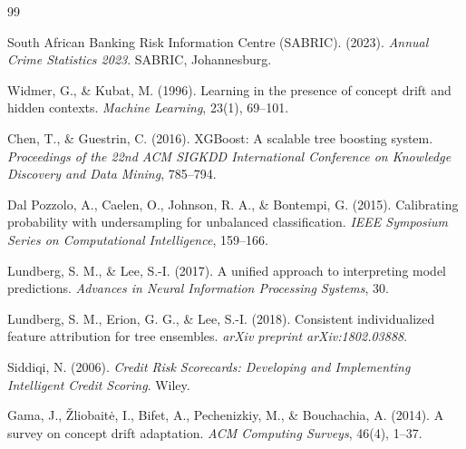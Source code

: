 \documentclass[12pt, a4paper]{article}
\begin{document}
\newpage
\begin{thebibliography}{99}

South African Banking Risk Information Centre (SABRIC). (2023).
\textit{Annual Crime Statistics 2023}.
SABRIC, Johannesburg.

Widmer, G., \& Kubat, M. (1996).
Learning in the presence of concept drift and hidden contexts.
\textit{Machine Learning}, 23(1), 69--101.

Chen, T., \& Guestrin, C. (2016).
XGBoost: A scalable tree boosting system.
\textit{Proceedings of the 22nd ACM SIGKDD International Conference on Knowledge Discovery and Data Mining}, 785--794.

Dal Pozzolo, A., Caelen, O., Johnson, R. A., \& Bontempi, G. (2015).
Calibrating probability with undersampling for unbalanced classification.
\textit{IEEE Symposium Series on Computational Intelligence}, 159--166.

Lundberg, S. M., \& Lee, S.-I. (2017).
A unified approach to interpreting model predictions.
\textit{Advances in Neural Information Processing Systems}, 30.

Lundberg, S. M., Erion, G. G., \& Lee, S.-I. (2018).
Consistent individualized feature attribution for tree ensembles.
\textit{arXiv preprint arXiv:1802.03888}.

Siddiqi, N. (2006).
\textit{Credit Risk Scorecards: Developing and Implementing Intelligent Credit Scoring}.
Wiley.

Gama, J., \v{Z}liobait\.{e}, I., Bifet, A., Pechenizkiy, M., \& Bouchachia, A. (2014).
A survey on concept drift adaptation.
\textit{ACM Computing Surveys}, 46(4), 1--37.

\end{thebibliography}
\end{document}
